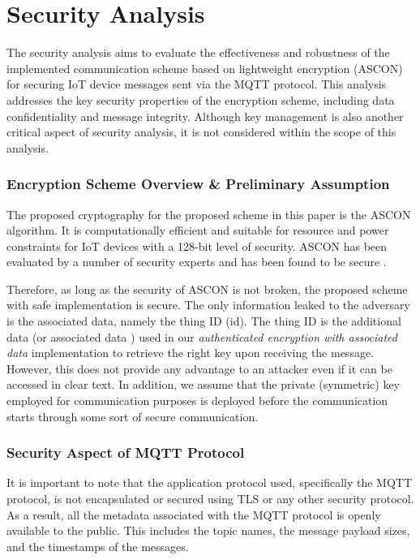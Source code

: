 
\section{Security Analysis}
The security analysis aims to evaluate the effectiveness and robustness of the implemented communication scheme based on lightweight encryption (ASCON) for securing IoT device messages sent via the MQTT protocol. This analysis addresses the key security properties of the encryption scheme, including data confidentiality and message integrity. Although key management is also another critical aspect of security analysis, it is not considered within the scope of this analysis.

\subsubsection*{Encryption Scheme Overview \& Preliminary Assumption}
\label{sec:preassum}
The proposed cryptography for the proposed scheme in this paper is the ASCON algorithm. It is computationally efficient and suitable for resource and power constraints for IoT devices  with a 128-bit level of security. ASCON has been evaluated by a number of security experts and has been found to be secure \cite{dobraunig_ascon_nodate}.

Therefore, as long as the security of ASCON is not broken, the proposed scheme with safe implementation is secure. The only information leaked to the adversary is the associated data, namely the thing ID (id). The thing ID is the additional data (or associated data ) used in our \textit{authenticated encryption with associated data} implementation to retrieve the right key upon receiving the message. However, this does not provide any advantage to an attacker even if it can be accessed in clear text. In addition, we assume that the private (symmetric) key employed for communication purposes is deployed before the communication starts through some sort of secure communication. 

\subsubsection{Security Aspect of MQTT Protocol}

It is important to note that the application protocol used, specifically the MQTT protocol, is not encapsulated or secured using TLS or any other security protocol. As a result, all the metadata associated with the MQTT protocol is openly available to the public. This includes the topic names, the message payload sizes, and the timestamps of the messages.

